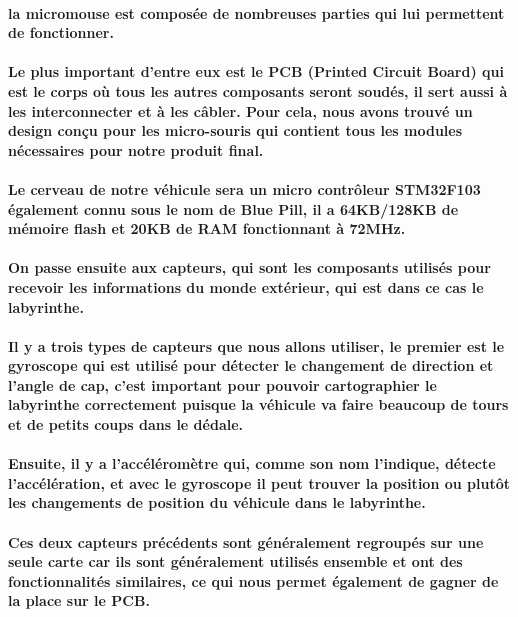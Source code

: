 \paragraph{
	la micromouse est composée de nombreuses parties qui lui permettent de fonctionner.
}

\paragraph{
	Le plus important d'entre eux est le PCB (Printed Circuit Board) qui est le corps 
où tous les autres composants seront soudés, il sert aussi à les interconnecter et 
à les câbler. Pour cela, nous avons trouvé un design conçu pour les micro-souris 
qui contient tous les modules nécessaires pour notre produit final.
}

\paragraph{
	Le cerveau de notre véhicule sera un micro contrôleur STM32F103 également connu 
sous le nom de Blue Pill, il a 64KB/128KB de mémoire flash et 20KB de RAM fonctionnant 
à 72MHz.
}

\paragraph{
	On passe ensuite aux capteurs, qui sont les composants utilisés pour recevoir les 
informations du monde extérieur, qui est dans ce cas le labyrinthe.
}

\paragraph{
	Il y a trois types de capteurs que nous allons utiliser, le premier est le gyroscope 
qui est utilisé pour détecter le changement de direction et l'angle de cap, c'est 
important pour pouvoir cartographier le labyrinthe correctement puisque la véhicule 
va faire beaucoup de tours et de petits coups dans le dédale.
}

\paragraph{
	Ensuite, il y a l'accéléromètre qui, comme son nom l'indique, détecte l'accélération, 
et avec le gyroscope il peut trouver la position ou plutôt les changements de position 
du véhicule dans le labyrinthe. 
}

\paragraph{
	Ces deux capteurs précédents sont généralement regroupés sur une seule carte car 
ils sont généralement utilisés ensemble et ont des fonctionnalités similaires, ce 
qui nous permet également de gagner de la place sur le PCB.
}

